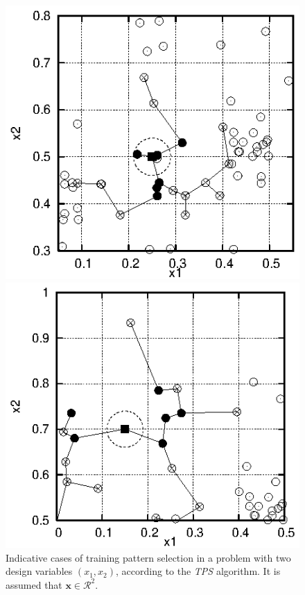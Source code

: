 \documentclass{vki_ls}
\newcommand{\vect}[1]{\bm{#1}}
\newcommand{\set}[1]{\mathcal{#1}}
\begin{document}
\begin{figure}[h!]
%
    \begin{minipage}{0.49\linewidth}
        \includegraphics[scale=1.0]{stp_badrbf_st2.eps}
    \end{minipage}
    \begin{minipage}{0.49\linewidth}
        \includegraphics[scale=1.0]{stp_outrbf_st2.eps}
    \end{minipage}
    \caption{Indicative cases of training pattern selection in a
            problem with two design variables $(x_1,x_2)$, according
            to the \emph{TPS} algorithm. It is assumed that 
	    $\vect{x}\!\in\!\set{R}^2$.}
    \label{tps:tps_mst}
\end{figure}
\end{document}
